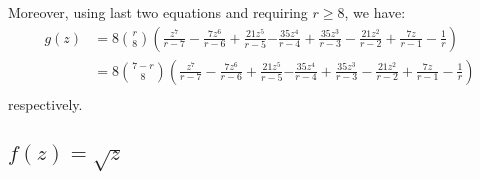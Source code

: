Moreover, using last two equations and requiring $r \geq 8$, we have:
\begin{displaymath}
\begin{split}
g{\left (z \right )} &= 8 {\binom{r}{8}} \left( \frac{z^{7}}{r - 7} - \frac{7 z^{6}}{r - 6} + \frac{21 z^{5}}{r - 5}\right. \left. - \frac{35 z^{4}}{r - 4} + \frac{35 z^{3}}{r - 3} - \frac{21 z^{2}}{r - 2} + \frac{7 z}{r - 1} - \frac{1}{r} \right) \\
&= 8 {\binom{7-r}{8}} \left( \frac{z^{7}}{r - 7} - \frac{7 z^{6}}{r - 6} + \frac{21 z^{5}}{r - 5}\right. \left. - \frac{35 z^{4}}{r - 4} + \frac{35 z^{3}}{r - 3} - \frac{21 z^{2}}{r - 2} + \frac{7 z}{r - 1} - \frac{1}{r} \right) \\
\end{split}
\end{displaymath}
respectively.


\subsection{$f(z)=\sqrt{z}$}


